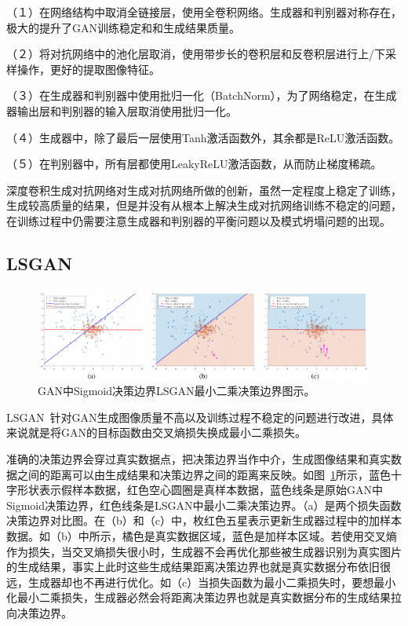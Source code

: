 （１）在网络结构中取消全链接层，使用全卷积网络。生成器和判别器对称存在，极大的提升了GAN训练稳定和和生成结果质量。

（２）将对抗网络中的池化层取消，使用带步长的卷积层和反卷积层进行上/下采样操作，更好的提取图像特征。

（３）在生成器和判别器中使用批归一化（BatchNorm），为了网络稳定，在生成器输出层和判别器的输入层取消使用批归一化。

（４）生成器中，除了最后一层使用Tanh激活函数外，其余都是ReLU激活函数。

（５）在判别器中，所有层都使用LeakyReLU激活函数，从而防止梯度稀疏。

深度卷积生成对抗网络对生成对抗网络所做的创新，虽然一定程度上稳定了训练，生成较高质量的结果，但是并没有从根本上解决生成对抗网络训练不稳定的问题，在训练过程中仍需要注意生成器和判别器的平衡问题以及模式坍塌问题的出现。

\subsection{LSGAN}
\begin{figure}[ht]
    \centering
	\includegraphics[width=\textwidth]{figs/lsgan.pdf}
	\caption{GAN中Sigmoid决策边界LSGAN最小二乘决策边界图示。}
	\label{fig:pic_lsgan}
\end{figure}

LSGAN~\cite{mao2017least}针对GAN生成图像质量不高以及训练过程不稳定的问题进行改进，具体来说就是将GAN的目标函数由交叉熵损失换成最小二乘损失。

准确的决策边界会穿过真实数据点，把决策边界当作中介，生成图像结果和真实数据之间的距离可以由生成结果和决策边界之间的距离来反映。如图~\ref{fig:pic_lsgan}所示，蓝色十字形状表示假样本数据，红色空心圆圈是真样本数据，蓝色线条是原始GAN中Sigmoid决策边界，红色线条是LSGAN中最小二乘决策边界。（a）是两个损失函数决策边界对比图。在（b）和（c）中，枚红色五星表示更新生成器过程中的加样本数据。如（b）中所示，橘色是真实数据区域，蓝色是加样本区域。若使用交叉熵作为损失，当交叉熵损失很小时，生成器不会再优化那些被生成器识别为真实图片的生成结果，事实上此时这些生成结果距离决策边界也就是真实数据分布依旧很远，生成器却也不再进行优化。如（c）当损失函数为最小二乘损失时，要想最小化最小二乘损失，生成器必然会将距离决策边界也就是真实数据分布的生成结果拉向决策边界。

